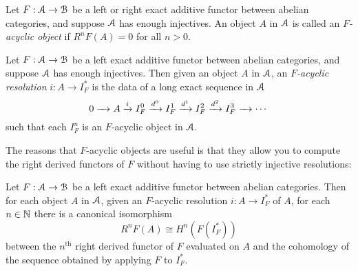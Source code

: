 \documentclass[../main.tex]{subfiles}
\begin{document}
\begin{definition}\label{defn:acyclic_object}
	Let $F:\mathcal A\to\mathcal B$ be a left or right exact additive functor between abelian categories, and suppose $\mathcal A$ has enough injectives. An object $A$ in $\mathcal A$ is called an \emph{$F$-acyclic object} if $R^nF(A)=0$ for all $n>0$.
\end{definition}

\begin{definition}\label{defn:acyclic_resolution}
	Let $F:\mathcal A\to\mathcal B$ be a left exact additive functor between abelian categories, and suppose $\mathcal A$ has enough injectives. Then given an object $A$ in $\mathcal A$, an \emph{$F$-acyclic resolution} $i:A\to I_F^*$ is the data of a long exact sequence in $\mathcal A$
	\[0\xrightarrow{\phantom{d^2}}A\xrightarrow iI_F^0\xrightarrow{d^0}I_F^1\xrightarrow{d^1}I_F^2\xrightarrow{d^2}I_F^3\xrightarrow{\phantom{d^2}}\cdots\]
	such that each $I_F^n$ is an $F$-acyclic object in $\mathcal A$.
\end{definition}

The reasons that $F$-acyclic objects are useful is that they allow you to compute the right derived functors of $F$ without having to use strictly injective resolutions:

\begin{proposition}\label{acyclic_resolution_computes_R^nF}
	Let $F:\mathcal A\to\mathcal B$ be a left exact additive functor between abelian categories. Then for each object $A$ in $\mathcal A$, given an $F$-acyclic resolution $i:A\to I_F^*$ of $A$, for each $n\in\mathbb{N}$ there is a canonical isomorphism
	\[R^nF(A)\cong H^n(F(I_F^*))\]
	between the $n^\text{th}$ right derived functor of $F$ evaluated on $A$ and the cohomology of the sequence obtained by applying $F$ to $I_F^*$.
\end{proposition}
\end{document}
